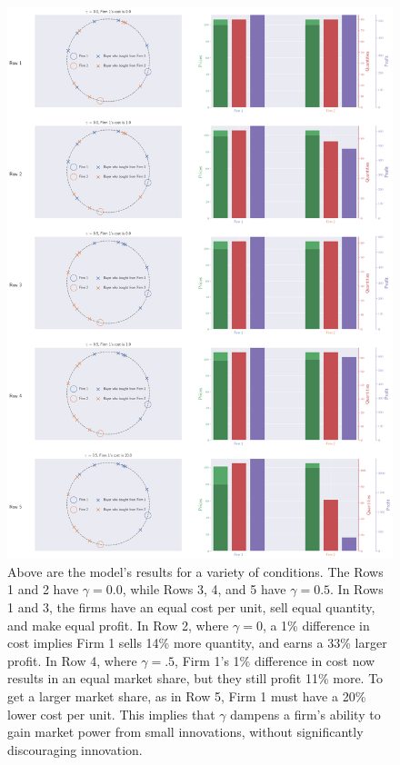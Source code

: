 \documentclass[11pt]{article}
\begin{document}
\begin{figure}[[p!htb] %
  \centering
  \vspace{-2cm} %
  \includegraphics[width=\linewidth]{5x2plot.png}
  \caption{\small{Above are the model's results for a variety of
  conditions. The Rows 1 and 2 have $\gamma=0.0$, while Rows 3, 4, and 5 have
  $\gamma = 0.5$. In Rows 1 and 3, the firms have an equal cost per unit, sell
  equal quantity, and make equal profit. In Row 2, where $\gamma=0$, a 1\%
  difference in cost implies Firm 1 sells 14\% more quantity, and earns a 33\%
  larger profit.
  In Row 4, where $\gamma=.5$, Firm 1's 1\% difference in cost now results in
  an equal market share, but they still profit 11\% more. To get a larger
  market share, as in Row 5, Firm 1 must have a 20\% lower cost per unit. This
  implies that $\gamma$ dampens a firm's ability to gain market power from
  small innovations, without significantly discouraging innovation. 
  }}
  \label{fig:fig3x2SingleTimestep}
\end{figure}
\end{document}
